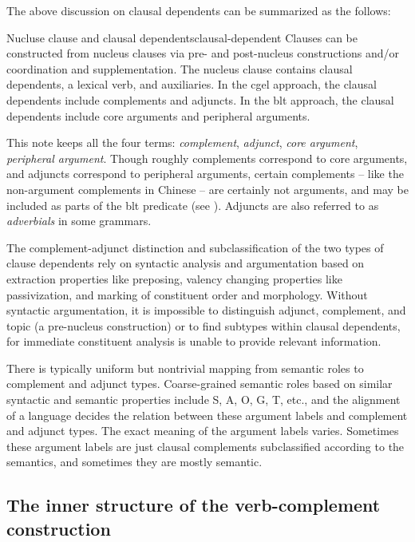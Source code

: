 \documentclass[UTF8, a4paper, oneside, scheme=plain]{ctexart}
\newcommand*{\term}[1]{\emph{#1}}
\begin{document}
The above discussion on clausal dependents can be summarized as the follows:
\begin{infobox}{Nucluse clause and clausal dependents}{clausal-dependent}
    Clauses can be constructed from nucleus clauses via pre- and post-nucleus constructions 
    and/or coordination and supplementation.
    The nucleus clause contains clausal dependents, a lexical verb, and auxiliaries.
    In the \ac{cgel} approach, the clausal dependents include complements and adjuncts.
    In the \ac{blt} approach, the clausal dependents include core arguments and peripheral arguments.

    This note keeps all the four terms: \term{complement}, \term{adjunct}, 
    \term{core argument}, \term{peripheral argument}.
    Though roughly complements correspond to core arguments,
    and adjuncts correspond to peripheral arguments,
    certain complements -- like the non-argument complements in Chinese -- 
    are certainly not arguments, and may be included as parts of the \ac{blt} predicate 
    (see ).
    Adjuncts are also referred to as \term{adverbials} in some grammars.

    The complement-adjunct distinction and subclassification of the two types of clause dependents 
    rely on syntactic analysis and argumentation 
    based on extraction properties like preposing,
    valency changing properties like passivization,
    and marking of constituent order and morphology.
    Without syntactic argumentation, 
    it is impossible to distinguish adjunct, complement, and topic (a pre-nucleus construction) 
    or to find subtypes within clausal dependents,
    for immediate constituent analysis is unable to provide relevant information.
    
    There is typically uniform but nontrivial mapping from semantic roles to complement and adjunct types.
    Coarse-grained semantic roles based on similar syntactic and semantic properties 
    include S, A, O, G, T, etc.,
    and the alignment of a language decides 
    the relation between these argument labels
    and complement and adjunct types.
    The exact meaning of the argument labels varies.
    Sometimes these argument labels are just clausal complements subclassified 
    according to the semantics,
    and sometimes they are mostly semantic.
\end{infobox}

\subsection{The inner structure of the verb-complement construction}
\end{document}
